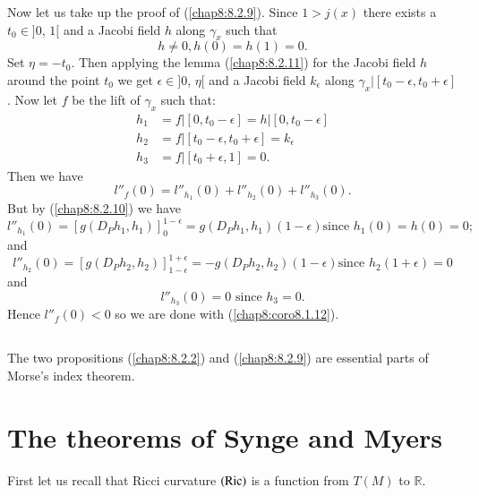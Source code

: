 Now let us take up the proof of (\ref{chap8:8.2.9}). Since $1>j(x)$
there exists a $t_{0}\in ]0$, $1[$ and a Jacobi field $h$ along
    $\gamma_{x}$ such that
$$
h\neq 0, h(0)=h(1)=0.
$$
Set $\eta=-t_{0}$. Then applying the lemma (\ref{chap8:8.2.11}) for the
Jacobi field $h$ around the point $t_{0}$ we get $\epsilon \in ]0$,
  $\eta[$ and a Jacobi field $k_{\epsilon}$ along
    $\gamma_{x}|[t_{0}-\epsilon, t_{0}+\epsilon]$. Now let $f$ be the
    lift of $\gamma_{x}$ such that:
\begin{align*}
h_{1} &= f|[0,t_{0}-\epsilon]=h|[0,t_{0}-\epsilon]\\
h_{2} &= f|[t_{0}-\epsilon, t_{0}+\epsilon]=k_{\epsilon}\\
h_{3} &= f|[t_{0}+\epsilon,1]=0.
\end{align*}
Then \pageoriginale we have
$$
l''_{f}(0)=l''_{h_{1}}(0)+l''_{h_{2}}(0)+l''_{h_{3}}(0).
$$
But by (\ref{chap8:8.2.10}) we have
$$
l''_{h_{1}}(0)=\left[g(D_{P}h_{1},h_{1})\right]^{1-\epsilon}_{0}=g(D_{P}h_{1},h_{1})(1-\epsilon)\text{
  \  since \ } h_{1}(0)=h(0)=0;
$$
and 
$$
l''_{h_{2}}(0)=\left[g(D_{P}h_{2},h_{2})\right]^{1+\epsilon}_{1-\epsilon}=-g(D_{P}h_{2},h_{2})(1-\epsilon)\text{
  \ since \ } h_{2}(1+\epsilon)=0
$$
and 
$$
l''_{h_{3}}(0)=0\text{ \  since \ } h_{3}=0.
$$
Hence $l''_{f}(0)<0$ so we are done with (\ref{chap8:coro8.1.12}).

\setcounter{subsection}{13}

\subsection{}\label{chap8:8.2.14}

\begin{remark*}
The two propositions (\ref{chap8:8.2.2}) and (\ref{chap8:8.2.9}) are
essential parts of Morse's index theorem.
\end{remark*}

\section{The theorems of Synge and Myers}\label{chap8:sec3}

First let us recall that Ricci curvature $(\operatorname{Ric})$ is a function from
$T(M)$ to $\mathbb{R}$.

\subsection{}\label{chap8:8.3.1}

